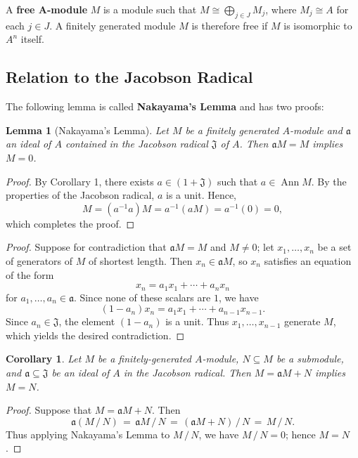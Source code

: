 \documentclass[11pt]{article}
\newtheorem{lemma}{Lemma}
\newtheorem{corollary}{Corollary}
\newcommand{\Ann}{\operatorname{Ann}}
\begin{document}
A \textbf{free A-module} $M$ is a module such that $M \cong \bigoplus_{j \in J} M_{j}$, where $M_{j} \cong A$ for each $j \in J$. A finitely generated module $M$ is therefore free if $M$ is isomorphic to $A^{n}$ itself.

\subsection{Relation to the Jacobson Radical}


The following lemma is called \textbf{Nakayama's Lemma} and has two proofs:

\begin{adjustwidth}{0.5cm}{}
	\begin{lemma}[Nakayama's Lemma]
		Let $M$ be a finitely generated $A$-module and $\mathfrak{a}$ an ideal of $A$ contained in the Jacobson radical $\mathfrak{J}$ of $A$. Then $\mathfrak{a}M = M$ implies $M = 0$.
	\end{lemma}
	\begin{proof}
		By Corollary 1, there exists $a \in (1 + \mathfrak{J})$ such that $a \in \Ann M$. By the properties of the Jacobson radical, $a$ is a unit. Hence,
		\[
			M = (a^{-1}a)M = a^{-1}(aM) = a^{-1}(0) = 0,
		\]
    which completes the proof.
	\end{proof}
	\begin{proof}
		Suppose for contradiction that $\mathfrak{a}M = M$ and $M \ne 0$; let $x_{1}, \ldots, x_{n}$ be a set of generators of $M$ of shortest length. Then $x_{n} \in \mathfrak{a}M$, so $x_{n}$ satisfies an equation of the form
		\[
			 x_{n} = a_{1} x_{1} + \cdots + a_{n} x_{n}
		\]
		for $a_{1}, \ldots, a_{n} \in \mathfrak{a}$. Since none of these scalars are $1$, we have
		\[
			(1 - a_{n})x_{n} = a_{1}x_{1} + \cdots + a_{n - 1}x_{n - 1}.
		\]
    Since $a_{n} \in \mathfrak{J}$, the element $(1 - a_{n})$ is a unit. Thus $x_{1}, \ldots, x_{n - 1}$ generate $M$, which yields the desired contradiction.
	\end{proof}
\end{adjustwidth}

\begin{adjustwidth}{0.5cm}{}
	\begin{corollary}
		Let $M$ be a finitely-generated $A$-module, $N \subseteq M$ be a submodule, and $\mathfrak{a} \subseteq \mathfrak{J}$ be an ideal of $A$ in the Jacobson radical. Then $M = \mathfrak{a}M + N$ implies $M = N$.
	\end{corollary}
	\begin{proof}
    Suppose that $M = \mathfrak{a}M + N$. Then
    \[
      \mathfrak{a}(M \, / \, N) \, = \, \mathfrak{a}M \, / \, N \, = \, (\mathfrak{a}M + N) \, / \, N \, = \, M \, / \, N.
    \]
    Thus applying Nakayama's Lemma to $M \, / \, N$, we have $M \, / \, N = 0$; hence $M = N$.
	\end{proof}
\end{adjustwidth}
\end{document}
